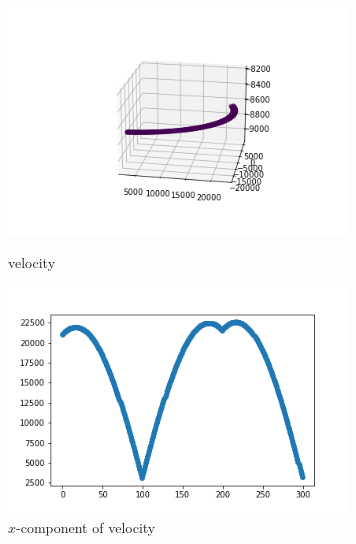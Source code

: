 \documentclass[12pt]{article}
\begin{document}
	\begin{figure}[H]
		\begin{multicols}{2}
			\includegraphics[width=\linewidth, height=6cm]{vs3Bz.png} \caption{velocity} \label{vs3Bz} \par
			\includegraphics[width=\linewidth, height=6cm]{vsx3Bz.png} \caption{$x$-component of velocity} \label{vsx3Bz} \par
		\end{multicols}
	\end{figure}
\end{document}
